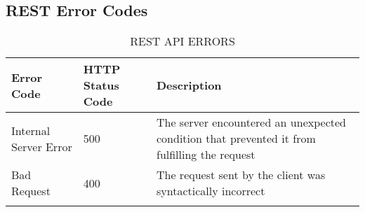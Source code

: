 \subsection{REST Error Codes}


\begin{longtable}{|p{}|p{} |p{}|} 
\hline
\textbf{Error Code} & \textbf{HTTP Status Code} & \textbf{Description} \\\hline
Internal Server Error & 500 &  The server encountered an unexpected condition that prevented it from fulfilling the request \\\hline
Bad Request & 400 &  The request sent by the client was syntactically incorrect \\\hline
\caption{REST API ERRORS}
\label{tab:termGlossary2}
\end{longtable}